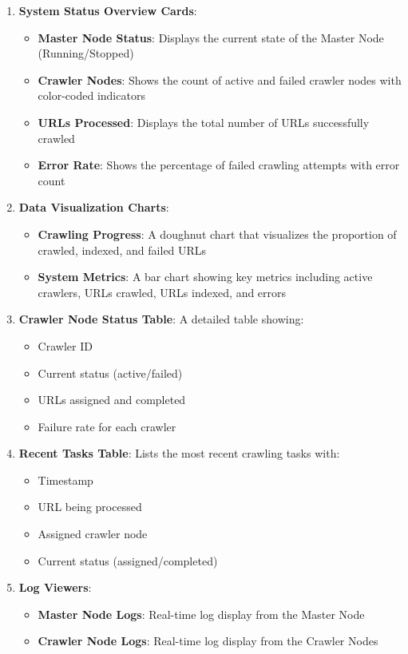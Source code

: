 \documentclass[12pt]{article}
\begin{document}
\begin{enumerate}
    \item \textbf{System Status Overview Cards}: 
    \begin{itemize}
        \item \textbf{Master Node Status}: Displays the current state of the Master Node (Running/Stopped)
        \item \textbf{Crawler Nodes}: Shows the count of active and failed crawler nodes with color-coded indicators
        \item \textbf{URLs Processed}: Displays the total number of URLs successfully crawled
        \item \textbf{Error Rate}: Shows the percentage of failed crawling attempts with error count
    \end{itemize}
    
    \item \textbf{Data Visualization Charts}:
    \begin{itemize}
        \item \textbf{Crawling Progress}: A doughnut chart that visualizes the proportion of crawled, indexed, and failed URLs
        \item \textbf{System Metrics}: A bar chart showing key metrics including active crawlers, URLs crawled, URLs indexed, and errors
    \end{itemize}
    
    \item \textbf{Crawler Node Status Table}: A detailed table showing:
    \begin{itemize}
        \item Crawler ID
        \item Current status (active/failed)
        \item URLs assigned and completed
        \item Failure rate for each crawler
    \end{itemize}
    
    \item \textbf{Recent Tasks Table}: Lists the most recent crawling tasks with:
    \begin{itemize}
        \item Timestamp
        \item URL being processed
        \item Assigned crawler node
        \item Current status (assigned/completed)
    \end{itemize}
    
    \item \textbf{Log Viewers}:
    \begin{itemize}
        \item \textbf{Master Node Logs}: Real-time log display from the Master Node
        \item \textbf{Crawler Node Logs}: Real-time log display from the Crawler Nodes
    \end{itemize}
\end{enumerate}
\end{document}
